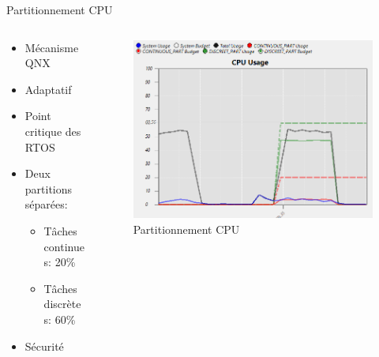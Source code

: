 \documentclass{beamer}
\begin{document}
\begin{frame}{Partitionnement CPU}

\begin{columns}
    
    \begin{column}{0.45\paperwidth}
        \begin{itemize}
            \item Mécanisme QNX
            \item Adaptatif
            \item Point critique des RTOS
            \item Deux partitions séparées:
            \begin{itemize}
                \item Tâches continues: 20\%
                \item Tâches discrètes: 60\%
            \end{itemize}
        \item Sécurité
        \end{itemize}
    \end{column}
    
    \begin{column}{0.55\paperwidth}
       \begin{figure}
           \centering
           \includegraphics[width=0.5\paperwidth]{partitionnement.png}
           \caption{Partitionnement CPU}
       \end{figure}
    \end{column}
    
\end{columns}


    
    
\end{frame}
\end{document}
